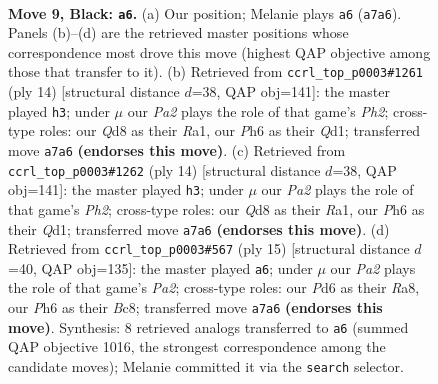 \documentclass[11pt]{article}
\begin{document}
\clearpage

\begin{figure}[p]\centering
\begin{subfigure}{0.46\textwidth}\centering
\resizebox{\linewidth}{!}{%
\newchessgame
\chessboard[
  setfen={r1bq1rk1/ppp2pp1/1bnp1n1p/4p3/PPB1P2P/2PP1N2/5PP1/RNBQ1RK1 b - - 0 9},
  showmover=false,
  pgfstyle=straightmove, color=movearrow, markmove={a7-a6}
]}
\caption{}
\end{subfigure}\hfill
\begin{subfigure}{0.46\textwidth}\centering
\resizebox{\linewidth}{!}{%
\newchessgame
\chessboard[
  setfen={rnbq1rk1/1p3ppp/2pp1n2/p1b1p3/P1B1P3/2NP1N2/1PP2PPP/R1BQ1RK1 w - - 0 8},
  showmover=false,
  pgfstyle=straightmove, color=movearrow, markmove={h2-h3}
]}
\caption{}
\end{subfigure}
\\[4pt]
\begin{subfigure}{0.46\textwidth}\centering
\resizebox{\linewidth}{!}{%
\newchessgame
\chessboard[
  setfen={rnbq1rk1/1p3ppp/2pp1n2/p1b1p3/P1B1P3/2NP1N2/1PP2PPP/R1BQ1RK1 w - - 0 8},
  showmover=false,
  pgfstyle=straightmove, color=movearrow, markmove={h2-h3}
]}
\caption{}
\end{subfigure}\hfill
\begin{subfigure}{0.46\textwidth}\centering
\resizebox{\linewidth}{!}{%
\newchessgame
\chessboard[
  setfen={r1b1k2r/ppp1qppp/1bnp1n2/4p3/PPB1P3/2PP1N2/5PPP/RNBQ1RK1 b kq - 0 8},
  showmover=false,
  pgfstyle=straightmove, color=movearrow, markmove={a7-a6}
]}
\caption{}
\end{subfigure}
\caption{\textbf{Move 9, Black: \texttt{a6}.} (a) Our position; Melanie plays \texttt{a6} (\texttt{a7a6}). Panels (b)--(d) are the retrieved master positions whose correspondence most drove this move (highest QAP objective among those that transfer to it). (b) Retrieved from \texttt{ccrl\_top\_p0003\#1261} (ply 14) [structural distance $d$=38, QAP obj=141]: the master played \texttt{h3}; under $\mu$ our \emph{Pa2} plays the role of that game's \emph{Ph2}; cross-type roles: our \emph{Q}d8 as their \emph{R}a1, our \emph{P}h6 as their \emph{Q}d1; transferred move \texttt{a7a6} \textbf{(endorses this move)}. (c) Retrieved from \texttt{ccrl\_top\_p0003\#1262} (ply 14) [structural distance $d$=38, QAP obj=141]: the master played \texttt{h3}; under $\mu$ our \emph{Pa2} plays the role of that game's \emph{Ph2}; cross-type roles: our \emph{Q}d8 as their \emph{R}a1, our \emph{P}h6 as their \emph{Q}d1; transferred move \texttt{a7a6} \textbf{(endorses this move)}. (d) Retrieved from \texttt{ccrl\_top\_p0003\#567} (ply 15) [structural distance $d$=40, QAP obj=135]: the master played \texttt{a6}; under $\mu$ our \emph{Pa2} plays the role of that game's \emph{Pa2}; cross-type roles: our \emph{P}d6 as their \emph{R}a8, our \emph{P}h6 as their \emph{B}c8; transferred move \texttt{a7a6} \textbf{(endorses this move)}. Synthesis: 8 retrieved analogs transferred to \texttt{a6} (summed QAP objective 1016, the strongest correspondence among the candidate moves); Melanie committed it via the \texttt{search} selector.}
\label{fig:thought-m17}
\end{figure}
\end{document}
